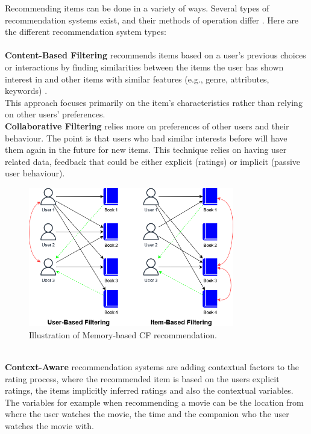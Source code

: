 \documentclass{llncs}
\begin{document}
Recommending items can be done in a variety of ways. Several types of recommendation systems exist, and their methods of operation differ \cite{Roy2022}. Here are the different recommendation system types:\\\\
%
%
\textbf{Content-Based Filtering} recommends items based on a user's previous choices or interactions by finding similarities between the items the user has shown interest in and other items with similar features (e.g., genre, attributes, keywords) \cite{pub.1034486657}.\\
This approach focuses primarily on the item's characteristics rather than relying on other users' preferences.\\
\textbf{Collaborative Filtering} relies more on preferences of other users and their behaviour. The point is that users who had similar interests before will have them again in the future for new items. This technique relies on having user related data, feedback that could be either explicit (ratings) or implicit (passive user behaviour).
\begin{figure}
\centering
\includegraphics[width=0.8\textwidth]{img/collaborative_example.png}
\caption{Illustration of Memory-based CF recommendation.} \label{fig:collaborative_example}
\end{figure}\\
\textbf{Context-Aware} recommendation systems are adding contextual factors to the rating process, where the recommended item is based on the users explicit ratings, the items implicitly inferred ratings and also the contextual variables. The variables for example when recommending a movie can be the location from where the user watches the movie, the time and the companion who the user watches the movie with.\\
\end{document}
